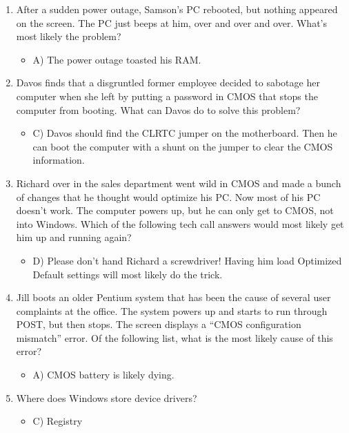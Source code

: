 \documentclass{article}
\begin{document}
\begin{enumerate}
    \item After a sudden power outage, Samson’s PC rebooted, but nothing
appeared on the screen. The PC just beeps at him, over and over and
over. What’s most likely the problem?
    \begin{itemize}
        \item A) The power outage toasted his RAM. 
    \end{itemize}
    \item Davos finds that a disgruntled former employee decided to sabotage
her computer when she left by putting a password in CMOS that stops
the computer from booting. What can Davos do to solve this
problem?
    \begin{itemize}
        \item C) Davos should find the CLRTC jumper on the motherboard. Then
he can boot the computer with a shunt on the jumper to clear the
CMOS information. 
    \end{itemize}
    \item Richard over in the sales department went wild in CMOS and made a
bunch of changes that he thought would optimize his PC. Now most
of his PC doesn’t work. The computer powers up, but he can only get
to CMOS, not into Windows. Which of the following tech call
answers would most likely get him up and running again?
    \begin{itemize}
        \item D) Please don’t hand Richard a screwdriver! Having him load
Optimized Default settings will most likely do the trick.
    \end{itemize}
    \item Jill boots an older Pentium system that has been the cause of several
user complaints at the office. The system powers up and starts to run
through POST, but then stops. The screen displays a “CMOS
configuration mismatch” error. Of the following list, what is the most
likely cause of this error?
    \begin{itemize}
        \item A) CMOS battery is likely dying.
    \end{itemize}
    
    \item Where does Windows store device drivers?
    \begin{itemize}
        \item C) Registry
    \end{itemize}
\end{enumerate}
\end{document}

